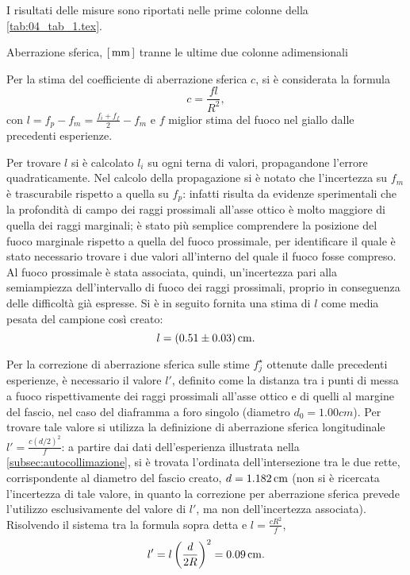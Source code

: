 
I risultati delle misure sono riportati nelle prime colonne della \autoref{tab:04_tab_1.tex}.
\begin{tabella}
	\centering
	
	\caption{Aberrazione sferica, $[\,\mathrm{mm}\,]$ tranne le ultime due colonne adimensionali}
	\label{tab:04_tab_1.tex}
\end{tabella}

Per la stima del coefficiente di aberrazione sferica $c$, si \`e considerata la formula
\[ c=\frac{f   l}{R^2}, \] 
con \( l = f_p - f_m = \frac{f_i + f_f}{2} - f_m \) e $f$ miglior stima del fuoco nel giallo dalle precedenti esperienze.


Per trovare $l$ si \`e calcolato $l_i$ su ogni terna di valori, propagandone l'errore quadraticamente. Nel calcolo della propagazione si \`e notato che l'incertezza su $f_m$ è trascurabile rispetto a quella su $f_p$: infatti risulta da evidenze sperimentali che la profondità di campo dei raggi prossimali all'asse ottico \`e molto maggiore di quella dei raggi marginali; è stato più semplice comprendere la posizione del fuoco marginale rispetto a quella del fuoco prossimale, per identificare il quale è stato necessario trovare i due valori all'interno del quale il fuoco fosse compreso. Al fuoco prossimale è stata associata, quindi, un'incertezza pari alla semiampiezza dell'intervallo di fuoco dei raggi prossimali, proprio in conseguenza delle difficolt\`a già espresse. Si \`e in seguito fornita una stima di $l$ come media pesata del campione cos\`i creato:
\[ l = (0.51 \pm 0.03) \,\mathrm{cm}. \]


Per la correzione di aberrazione sferica sulle stime $f^{\star}_j$ ottenute dalle precedenti esperienze, \`e necessario il valore $ l'$, definito come la distanza tra i punti di messa a fuoco rispettivamente dei raggi prossimali all'asse ottico e di quelli al margine del fascio, nel caso del diaframma a foro singolo (diametro $d_0=1.00 cm$). Per trovare tale valore si utilizza la definizione di aberrazione sferica longitudinale $l'=\frac{c(d/2)^2}{f}$: a partire dai dati dell'esperienza illustrata nella \autoref{subsec:autocollimazione}, si \`e trovata l'ordinata dell'intersezione tra le due rette, corrispondente al diametro del fascio creato, $d= 1.182 \,\mathrm{cm}$ (non si \`e ricercata l'incertezza di tale valore, in quanto la correzione per aberrazione sferica prevede l'utilizzo esclusivamente del valore di $l'$, ma non dell'incertezza associata). Risolvendo il sistema tra la formula sopra detta e $l=\frac{cR^2}{f}$, 
\[l' = l\left(\frac{d}{2R}\right)^2 = 0.09\,\mathrm{cm} .\]


